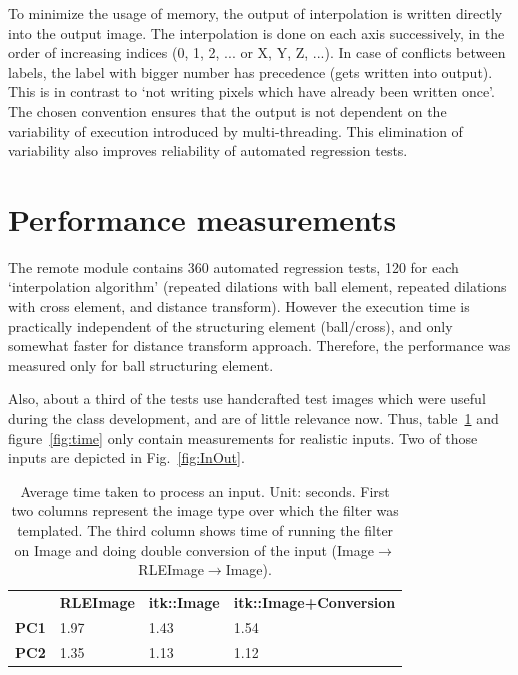 \documentclass{InsightArticle}
\begin{document}
To minimize the usage of memory, the output of interpolation is written
directly into the output image.
The interpolation is done on each axis successively,
in the order of increasing indices (0, 1, 2, ... or X, Y, Z, ...).
In case of conflicts between labels,
the label with bigger number has precedence (gets written into output).
This is in contrast to `not writing pixels which have already been written once'.
The chosen convention ensures that the output is not dependent on the
variability of execution introduced by multi-threading.
This elimination of variability also improves
reliability of automated regression tests.


\section{Performance measurements}

The remote module %
contains 360 automated regression tests, 120 for each `interpolation algorithm'
(repeated dilations with ball element, repeated dilations with cross element, and distance transform).
However the execution time is practically independent of the structuring element (ball/cross),
and only somewhat faster for distance transform approach.
Therefore, the performance was measured only for ball structuring element.

Also, about a third of the tests use handcrafted test images
which were useful during the class development, and are of little relevance now.
Thus, table~\ref{tab:time} and figure~\ref{fig:time} only contain measurements for realistic inputs.
Two of those inputs are depicted in Fig.~\ref{fig:InOut}.

\begin{table}[hbt]
	\centering
		\begin{tabular}{llll}
								 & \textbf{RLEImage} & \textbf{itk::Image} & \textbf{itk::Image+Conversion} \\
		\textbf{PC1} & 1.97              & 1.43                & 1.54                           \\
		\textbf{PC2} & 1.35              & 1.13                & 1.12                          
		\end{tabular}
	\caption{Average time taken to process an input. Unit: seconds.
	First two columns represent the image type over which the filter was templated.
	The third column shows time of running the filter on Image
	and doing double conversion of the input (Image$\rightarrow$RLEImage$\rightarrow$Image).}
	\label{tab:time}
\end{table}
\end{document}
